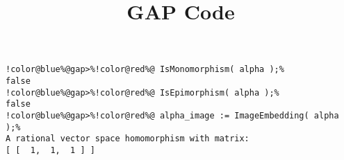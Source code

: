 \documentclass[12pt]{amsart}
\title{GAP Code}
\author{}
\begin{document}
\maketitle

\begin{Verbatim}[commandchars=!@\%,frame=single]
!color@blue%@gap>%!color@red%@ IsMonomorphism( alpha );%
false
!color@blue%@gap>%!color@red%@ IsEpimorphism( alpha );%
false
!color@blue%@gap>%!color@red%@ alpha_image := ImageEmbedding( alpha );%
A rational vector space homomorphism with matrix: 
[ [  1,  1,  1 ] ]
\end{Verbatim}
\end{document}

